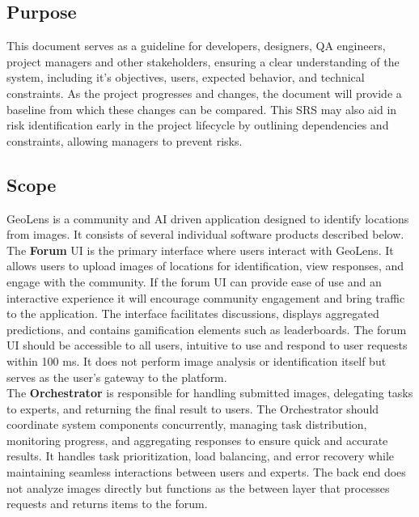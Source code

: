 \documentclass[]{article}
\begin{document}
\subsection{Purpose}
\label{sub:purpose}
This document serves as a guideline for developers, designers, QA engineers, project managers and other stakeholders, ensuring a clear understanding of the system, including it's objectives, users, expected behavior, and technical constraints.
As the project progresses and changes, the document will provide a baseline from which these changes can be compared. This SRS may also aid in risk identification early in the project lifecycle by outlining dependencies and constraints, allowing managers to prevent risks.

\subsection{Scope}
\label{sub:scope}
GeoLens is a community and AI driven application designed to identify locations from images. It consists of several individual software products described below.\\

The \textbf{Forum} UI is the primary interface where users interact with GeoLens. It allows users to upload images of locations for identification, view responses, and
engage with the community. If the forum UI can provide ease of use and an interactive experience it will encourage community engagement and bring traffic to the
application. The interface facilitates discussions, displays aggregated predictions, and contains gamification elements such as leaderboards. The forum UI should be accessible
to all users, intuitive to use and respond to user requests within 100 ms. It does not perform image analysis or identification itself but serves as the user’s gateway to the platform.\\

The \textbf{Orchestrator} is responsible for handling submitted images, delegating tasks to experts,
and returning the final result to users. The Orchestrator should coordinate system components concurrently, managing task distribution, monitoring progress, and aggregating responses to ensure quick and accurate results. It handles task prioritization, load balancing, and error recovery while maintaining seamless interactions between users and experts.
The back end does not analyze images directly but functions as the between layer that processes requests and returns items to the forum.\\
\end{document}
